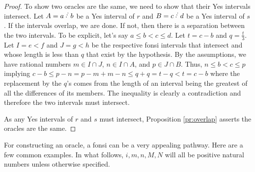 \documentclass[12pt]{article}
\begin{document}
\begin{proof}
To show two oracles are the same, we need to show that their Yes intervals intersect. Let $A=a\lte b$ be a Yes interval of $r$ and $B=c \lte d$ be a Yes interval of $s$. If the intervals overlap, we are done. If not, then there is a separation between the two intervals. To be explicit, let's say $a \leq b < c \leq d$. Let $t = c-b$ and $q = \frac{t}{3}$. Let $I= e\lt f$ and $J= g \lt h$ be the respective fonsi intervals that intersect and whose length is less than $q$ that exist by the hypothesis. By the assumptions, we have rational numbers $m \in I \cap J$, $n \in I \cap A$, and $p \in J \cap B$. Thus,  $n \leq b < c \leq p$ implying $c-b \leq p - n  = p-m + m-n \leq q + q = t - q < t = c-b$ where the replacement by the $q$'s comes from the length of an interval being the greatest of all the differences of its members. The inequality is clearly a contradiction and therefore the two intervals must intersect. 
 
As any Yes intervals of $r$ and $s$ must intersect, Proposition \ref{pr:overlap} asserts the oracles are the same.  
\end{proof}


For constructing an oracle, a fonsi can be a very appealing pathway.  Here are a few common examples. In what follows, $i, m, n, M, N$ will all be positive natural numbers unless otherwise specified.
\end{document}
